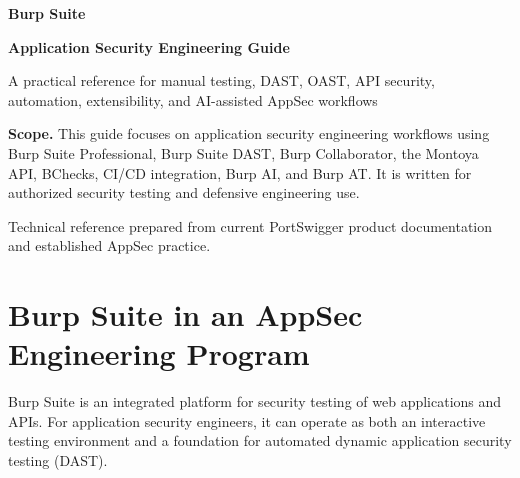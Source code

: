 \documentclass[11pt]{article}
\begin{document}
\hypersetup{pageanchor=false}%
\begin{titlepage}
  \centering
  \vspace*{1.1in}

  {\Huge\bfseries\color{accentdark}Burp Suite\par}
  \vspace{0.25em}
  {\LARGE\bfseries Application Security Engineering Guide\par}
  \vspace{0.8em}
  {\large\color{muted}A practical reference for manual testing, DAST, OAST, API security, automation, extensibility, and AI-assisted AppSec workflows\par}

  \vfill

  \begin{tcolorbox}[
    width=0.86\textwidth,
    colback=accentlight,
    colframe=accent,
    boxrule=0.8pt,
    arc=2pt,
    left=10pt,right=10pt,top=9pt,bottom=9pt
  ]
  \textbf{Scope.} This guide focuses on application security engineering workflows using Burp Suite Professional, Burp Suite DAST, Burp Collaborator, the Montoya API, BChecks, CI/CD integration, Burp AI, and Burp AT. It is written for authorized security testing and defensive engineering use.
  \end{tcolorbox}

  \vfill
  {\small\color{muted}Technical reference prepared from current PortSwigger product documentation and established AppSec practice.\par}
  \vspace*{0.5in}
\end{titlepage}\hypersetup{pageanchor=true}

\tableofcontents
\newpage

\section{Burp Suite in an AppSec Engineering Program}

Burp Suite is an integrated platform for security testing of web applications and APIs. For application security engineers, it can operate as both an interactive testing environment and a foundation for automated dynamic application security testing (DAST).
\end{document}
